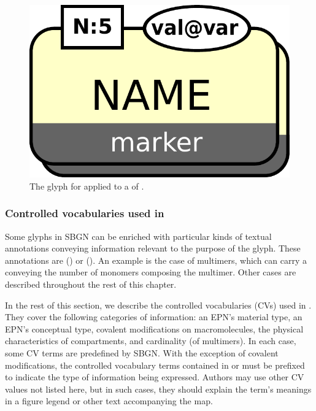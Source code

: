 \begin{figure}[H]
  \centering
  \includegraphics[scale = 0.3]{le_images/labeledCloneMarker}
  \caption{The \PD glyph for  applied to a  of  .}
  \label{fig:labeledCloneMarker}
\end{figure}


\subsubsection{Controlled vocabularies used in \SBGNPDLone}\label{sec:CVs}

Some glyphs in SBGN \PDs can be enriched with particular kinds of textual annotations conveying information relevant to the purpose of the glyph.  These annotations are  () or   ().  An example is the case of multimers, which can carry a  conveying the number of monomers composing the multimer.  Other cases are described throughout the rest of this chapter.

In the rest of this section, we describe the controlled vocabularies (CVs) used in \SBGNPDLone.  They cover the following categories of information: an EPN's material type, an EPN's conceptual type, covalent modifications on macromolecules, the physical characteristics of compartments, and cardinality (\eg of multimers).  In each case, some CV terms are predefined by SBGN. With the exception of covalent modifications, the controlled vocabulary terms contained in  or  must be prefixed to indicate the type of information being expressed.  Authors may use other CV values not listed here, but in such cases, they should explain the term's meanings in a figure legend or other text accompanying the map.


